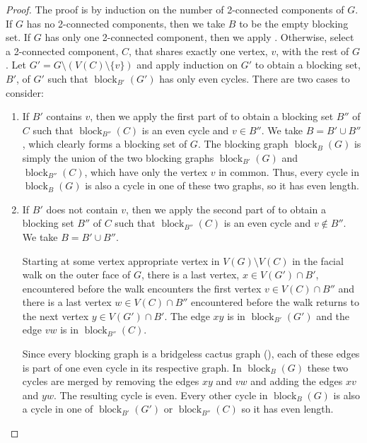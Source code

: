 \documentclass{patmorin}
\DeclareMathOperator{\block}{block}
\begin{document}
\begin{proof}
  The proof is by induction on the number of 2-connected components
  of $G$.  If $G$ has no 2-connected components, then we take $B$ to be
  the empty blocking set.  If $G$ has only one 2-connected component,
  then we apply .
  Otherwise, select a 2-connected component, $C$, that
  shares exactly one vertex, $v$, with the rest of $G$.  Let
  $G'=G\setminus(V(C)\setminus\{v\})$ and apply induction on $G'$
  to obtain a blocking set, $B'$, of $G'$ such that $\block_{B'}(G')$
  has only even cycles.  There are two cases to consider:
  \begin{enumerate}
    \item If $B'$ contains $v$, then we apply the first part of
     to obtain a blocking set $B''$ of $C$
    such that $\block_{B''}(C)$ is an even cycle and $v\in B''$.  We take
    $B=B'\cup B''$, which clearly forms a blocking set of $G$.  
    The blocking graph $\block_B(G)$ is simply the union of the
    two blocking graphs $\block_{B'}(G)$ and $\block_{B''}(C)$, which have
    only the vertex $v$ in common.  Thus, every cycle in $\block_B(G)$
    is also a cycle in one of these two graphs, so it has even length.

    \item If $B'$ does not contain $v$, then we apply the second part
    of  to obtain a blocking set $B''$ of $C$
    such that $\block_{B''}(C)$ is an even cycle and $v\not\in B''$.
    We take $B=B'\cup B''$.

    Starting at some vertex appropriate vertex in $V(G)\setminus V(C)$ 
    in the facial walk
    on the outer face of $G$, there is a last vertex, $x\in V(G')\cap B'$,
    encountered before the walk encounters the first vertex $v\in V(C)\cap
    B''$ and there is a last vertex $w\in V(C)\cap B''$ encountered
    before the walk returns to the next vertex $y\in V(G')\cap B'$.
    The edge $xy$ is in $\block_{B'}(G')$ and the edge $vw$ is in
    $\block_{B''}(C)$.  

    Since every blocking graph is a bridgeless cactus graph
    (), each of these edges is part of one even cycle
    in its respective graph. In $\block_{B}(G)$ these two cycles are
    merged by removing the edges $xy$ and $vw$ and adding the edges
    $xv$ and $yw$.  The resulting cycle is even.  Every other cycle
    in $\block_B(G)$ is also a cycle in one of $\block_{B'}(G')$ or
    $\block_{B''}(C)$ so it has even length. \qedhere
  \end{enumerate}
\end{proof}
\end{document}
